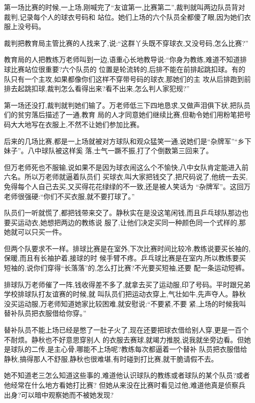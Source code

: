 ﻿\documentclass[12pt]{article}
\begin{document}
第一场比赛的时候,一上场,刚喊完了``友谊第一,比赛第二'',裁判就叫两边队员背对裁判,记录每个人的球衣号码和
站位。她们上场的六个队员全都傻了眼,因为她们衣服上没号码。

裁判把教育局主管比赛的人找来了,说:``这群丫头既不穿球衣,又没号码,怎么比赛?''

教育局的人把教练万老师叫到一边,语重心长地教导说:``你身为教练,难道不知道排球比赛站位很重要?六个队员的
位置是轮流转的,后排不能在前排起跳扣球。有的队只有一个主攻,如果都像你们这样不穿带号码的球衣,那她们的主
攻从后排跑到前排去起跳扣球,裁判怎么看得出来?看不出来,怎么判人家犯规?''

第一场还没打,裁判就判她们输了。万老师低三下四地恳求,又做声泪俱下状,把队员们的贫穷落后描述了一通,教育
局的人才同意她们继续比赛,但勒令她们用粉笔把号码大大地写在衣服上,不然不让她们参加比赛。

后来的几场比赛,都是一上场就被对方球队和观众猛笑一通,说她们是``杂牌军''``乡下妹子''。八中球队被这样奚
落,士气一蹶不振,打了个倒数第三回来了。

但万老师死也不服输,说如果不是因为球衣闹这么个不愉快,八中女队肯定能进入前六名。所以万老师就逼着队员们
买球衣,叫大家把钱交了,把尺码说了,他统一去买,免得每个人自己去买,又买得花花绿绿的不一致,还是被人笑话为
``杂牌军''。这回万老师很强硬:``你们不买衣服,就不要打球了。''

队员们一听就慌了,都把钱带来交了。静秋实在是没这笔闲钱,而且乒乓球队那边也要买运动衣,她想把两边的教练说
服了,让他们决定买同一种颜色同一个式样的,那她就可以只买一件。

但两个队要求不一样。排球比赛是在室外,下次比赛时间比较冷,教练说要买长袖的,保暖,而且有长袖护着,接球的时
候手臂不疼。乒乓球比赛是在室内,所以教练要买短袖的,说你们穿得``长落落''的,怎么打比赛?不光要买短袖,还要
配一条运动短裤。

排球队万老师催了一阵,钱收得差不多了,就拿去买了运动服,印了号码。平时跟兄弟学校排球队打友谊赛的时候,就
叫队员们把运动衣穿上,气壮如牛,先声夺人。静秋没买运动服,万老师知道她家比较困难,就安慰说:``不要紧,不要
紧,上场的时候我叫替补队员把衣服借给你穿。''

替补队员不能上场已经是憋了一肚子火了,现在还要把球衣借给别人穿,更是一百个不耐烦。静秋也不好意思穿别人
的衣服去赛球,就竭力推脱,说我就坐旁边看。但她是球队的二传,是主心骨,哪能不上场呢?教练每次都逼着一个替补
队员把衣服借给静秋,搞得那人不舒服,静秋也很难堪,有时碰到打比赛,就干脆请假不去。


她不知道老三怎么知道这些事的,难道他认识球队的教练或者球队的某个队员?或者他经常在什么地方看她打比赛?
但她从来没在比赛时看见过他,难道他真是侦察兵出身?可以暗中观察她而不被她发现?
\end{document}
